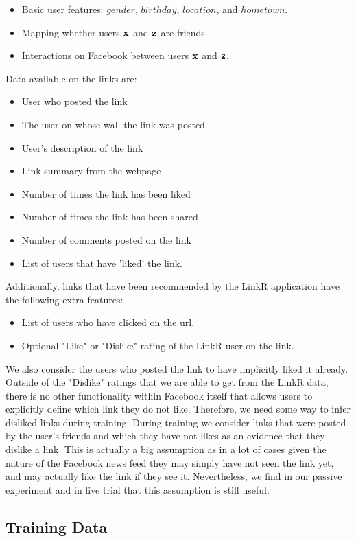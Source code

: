 \begin{itemize}
\item {Basic user features:  $gender$, $birthday$, $location$, and $hometown$.}
\item {Mapping whether users $\mathbf{x}$ and $\mathbf{z}$ are friends.}
\item {Interactions on Facebook between users $\mathbf{x}$ and $\mathbf{z}$.}
\end{itemize}
Data available on the links are:
\begin{itemize}
\item{User who posted the link}
\item{The user on whose wall the link was posted}
\item{User's description of the link}
\item{Link summary from the webpage}
\item{Number of times the link has been liked}
\item{Number of times the link has been shared}
\item{Number of comments posted on the link}
\item{List of users that have 'liked' the link.}
\end{itemize}
Additionally, links that have been recommended by the LinkR application have the following extra features:
\begin{itemize}
\item{List of users who have clicked on the url.}
\item{Optional "Like" or "Dislike" rating of the LinkR user on the link.}
\end{itemize}

We also consider the users who posted the link to have implicitly liked it already. Outside of the "Dislike" ratings that we are able to get from the LinkR data, there is no other functionality within Facebook itself that allows users to explicitly define which link they do not like. Therefore, we need some way to infer disliked links during training. During training we consider links that were posted by the user's friends and which they have not likes as an evidence that they dislike a link. This is actually a big assumption as in a lot of cases given the nature of the Facebook news feed they may simply have not seen the link yet, and may actually like the link if they see it. Nevertheless, we find in our passive experiment and in live trial that this assumption is still useful.

\subsection{Training Data}

